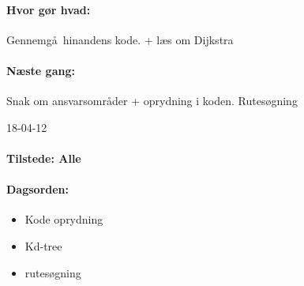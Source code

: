 \documentclass[a4paper,10pt,titlepage]{article}
\begin{document}
		\paragraph{Hvor g\o r hvad:}
		Gennemg\aa \ hinandens kode. + l\ae s om Dijkstra 
		
		\paragraph{N\ae ste gang:}
		Snak om ansvarsomr\aa der + oprydning i koden.
		Rutes\o gning\mbox{}\\
		
		\begin{center}
		18-04-12
		\end{center}
		
		\paragraph{Tilstede: Alle}
		\paragraph{Dagsorden:}
		\begin{itemize}
					\item Kode oprydning
					\item Kd-tree
					\item rutes\o gning
		\end{itemize}
		
\end{document}
